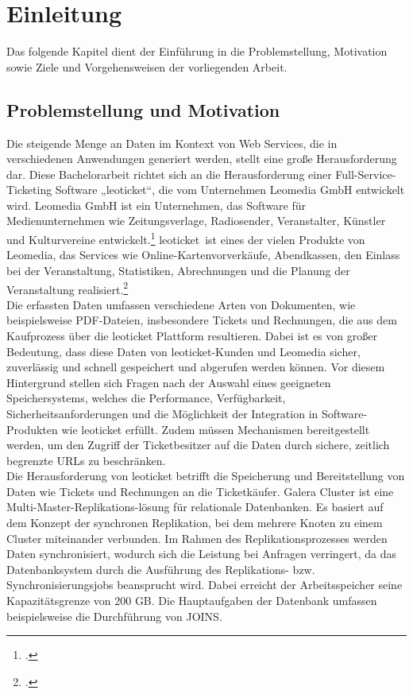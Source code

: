 \chapter{Einleitung}

Das folgende Kapitel dient der Einführung in die Problemstellung, Motivation sowie Ziele und Vorgehensweisen der vorliegenden Arbeit.

\section{Problemstellung und Motivation}

Die steigende Menge an Daten im Kontext von Web Services, die in verschiedenen Anwendungen generiert werden, stellt eine große Herausforderung dar. Diese Bachelorarbeit richtet sich an die Herausforderung einer Full-Service-Ticketing Software „leoticket“, die vom Unternehmen Leomedia GmbH entwickelt wird. 
Leomedia GmbH ist ein Unternehmen, das Software für Medienunternehmen wie Zeitungsverlage, Radiosender, Veranstalter, Künstler und Kulturvereine entwickelt.\footcite{leomedia-web}
\glqq leoticket\grqq\ ist eines der vielen Produkte von Leomedia, das Services wie Online-Kartenvorverkäufe, Abendkassen, den Einlass bei der Veranstaltung, Statistiken, Abrechnungen und die Planung der Veranstaltung realisiert.\footcite{leomedia-web}\\ 

Die erfassten Daten umfassen verschiedene Arten von Dokumenten, wie beispielsweise PDF-Dateien, insbesondere Tickets und Rechnungen, die aus dem Kaufprozess über die leoticket Plattform resultieren. Dabei ist es von großer Bedeutung, dass diese Daten von leoticket-Kunden und Leomedia sicher, zuverlässig und schnell gespeichert und abgerufen werden können. Vor diesem Hintergrund stellen sich Fragen nach der Auswahl eines geeigneten Speichersystems, welches die Performance, Verfügbarkeit, Sicherheitsanforderungen und die Möglichkeit der Integration in Software-Produkten wie leoticket erfüllt. Zudem müssen Mechanismen bereitgestellt werden, um den Zugriff der Ticketbesitzer auf die Daten durch sichere, zeitlich begrenzte URLs zu beschränken.\\

Die Herausforderung von leoticket betrifft die Speicherung und Bereitstellung von Daten wie Tickets und Rechnungen an die Ticketkäufer. Galera Cluster ist eine Multi-Master-Replikations-lösung für relationale Datenbanken. Es basiert auf dem Konzept der synchronen Replikation, bei dem mehrere Knoten zu einem Cluster miteinander verbunden. Im Rahmen des Replikationsprozesses werden Daten synchronisiert, wodurch sich die Leistung bei Anfragen verringert, da das Datenbanksystem durch die Ausführung des Replikations- bzw. Synchronisierungsjobs beansprucht wird. Dabei erreicht der Arbeitsspeicher seine Kapazitätsgrenze von 200 GB. Die Hauptaufgaben der Datenbank umfassen beispielsweise die Durchführung von JOINS.\\ 

